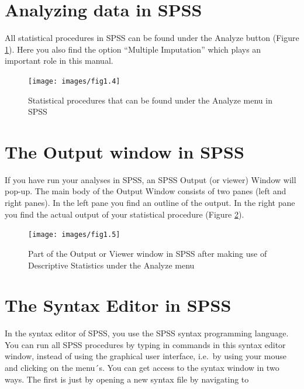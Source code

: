 \documentclass[
]{book}
\begin{document}
\hypertarget{analyzing-data-in-spss}{%
\section{Analyzing data in SPSS}\label{analyzing-data-in-spss}}

All statistical procedures in SPSS can be found under the Analyze button (Figure \ref{fig:fig4}). Here you also find the option ``Multiple Imputation'' which plays an important role in this manual.

\begin{figure}

{\centering \texttt{[image: images/fig1.4]} 

}

\caption{Statistical procedures that can be found under the Analyze menu in SPSS}\label{fig:fig4}
\end{figure}

\hypertarget{the-output-window-in-spss}{%
\section{The Output window in SPSS}\label{the-output-window-in-spss}}

If you have run your analyses in SPSS, an SPSS Output (or viewer) Window will pop-up. The main body of the Output Window consists of two panes (left and right panes). In the left pane you find an outline of the output. In the right pane you find the actual output of your statistical procedure (Figure \ref{fig:fig5}).

\begin{figure}

{\centering \texttt{[image: images/fig1.5]} 

}

\caption{Part of the Output or Viewer window in SPSS after making use of Descriptive Statistics under the Analyze menu}\label{fig:fig5}
\end{figure}

\hypertarget{the-syntax-editor-in-spss}{%
\section{The Syntax Editor in SPSS}\label{the-syntax-editor-in-spss}}

In the syntax editor of SPSS, you use the SPSS syntax programming language. You can run all SPSS procedures by typing in commands in this syntax editor window, instead of using the graphical user interface, i.e.~by using your mouse and clicking on the menu´s. You can get access to the syntax window in two ways. The first is just by opening a new syntax file by navigating to
\end{document}
